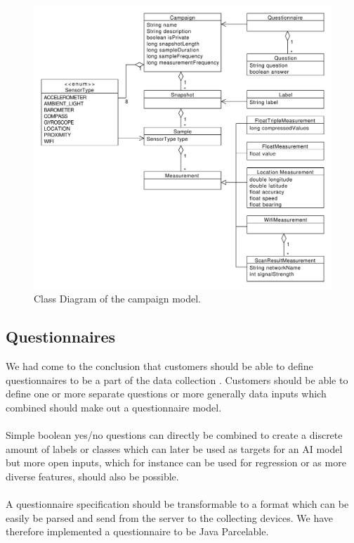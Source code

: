 \begin{figure}[!htbp]
    \centering
    \includegraphics[width=\textwidth]{graphic/gathering_sensor_data/model_class_diagram.pdf}
    \caption{Class Diagram of the campaign model.}
    \label{fig:model_class_diagram}
\end{figure}
\FloatBarrier


\subsection{Questionnaires}
We had come to the conclusion that customers should be able to define questionnaires to be a part of the data collection . Customers should be able to define one or more separate questions or more generally data inputs which combined should make out a questionnaire model. 
\\\\
Simple boolean yes/no questions can directly be combined to create a discrete amount of labels or classes which can later be used as targets for an AI model but more open inputs, which for instance can be used for regression or as more diverse features, should also be possible. 
\\\\
A questionnaire specification should be transformable to a format which can be easily be parsed and send from the server to the collecting devices. We have therefore implemented a questionnaire to be Java Parcelable. 

